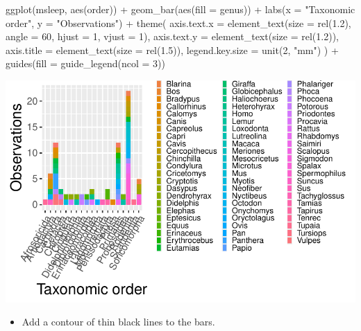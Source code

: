 \documentclass[
  letterpaper,
  DIV=11,
  numbers=noendperiod]{scrartcl}
\newenvironment{Shaded}{\begin{snugshade}}{\end{snugshade}}
\newcommand{\AttributeTok}[1]{\textcolor[rgb]{0.40,0.45,0.13}{#1}}
\newcommand{\DecValTok}[1]{\textcolor[rgb]{0.68,0.00,0.00}{#1}}
\newcommand{\FloatTok}[1]{\textcolor[rgb]{0.68,0.00,0.00}{#1}}
\newcommand{\FunctionTok}[1]{\textcolor[rgb]{0.28,0.35,0.67}{#1}}
\newcommand{\NormalTok}[1]{\textcolor[rgb]{0.00,0.23,0.31}{#1}}
\newcommand{\SpecialCharTok}[1]{\textcolor[rgb]{0.37,0.37,0.37}{#1}}
\newcommand{\StringTok}[1]{\textcolor[rgb]{0.13,0.47,0.30}{#1}}
\providecommand{\tightlist}{%
  \setlength{\itemsep}{0pt}\setlength{\parskip}{0pt}}\usepackage{longtable,booktabs,array}
\begin{document}
\begin{Shaded}
\begin{Highlighting}[]
\FunctionTok{ggplot}\NormalTok{(msleep, }\FunctionTok{aes}\NormalTok{(order)) }\SpecialCharTok{+}
  \FunctionTok{geom\_bar}\NormalTok{(}\FunctionTok{aes}\NormalTok{(}\AttributeTok{fill =}\NormalTok{ genus)) }\SpecialCharTok{+}
  \FunctionTok{labs}\NormalTok{(}\AttributeTok{x =} \StringTok{"Taxonomic order"}\NormalTok{, }\AttributeTok{y =} \StringTok{"Observations"}\NormalTok{) }\SpecialCharTok{+}
  \FunctionTok{theme}\NormalTok{(}
    \AttributeTok{axis.text.x =} \FunctionTok{element\_text}\NormalTok{(}\AttributeTok{size =} \FunctionTok{rel}\NormalTok{(}\FloatTok{1.2}\NormalTok{), }\AttributeTok{angle =} \DecValTok{60}\NormalTok{, }\AttributeTok{hjust =} \DecValTok{1}\NormalTok{, }\AttributeTok{vjust =} \DecValTok{1}\NormalTok{),}
    \AttributeTok{axis.text.y =} \FunctionTok{element\_text}\NormalTok{(}\AttributeTok{size =} \FunctionTok{rel}\NormalTok{(}\FloatTok{1.2}\NormalTok{)),}
    \AttributeTok{axis.title =} \FunctionTok{element\_text}\NormalTok{(}\AttributeTok{size =} \FunctionTok{rel}\NormalTok{(}\FloatTok{1.5}\NormalTok{)),}
    \AttributeTok{legend.key.size =} \FunctionTok{unit}\NormalTok{(}\DecValTok{2}\NormalTok{, }\StringTok{"mm"}\NormalTok{)}
\NormalTok{    ) }\SpecialCharTok{+}
  \FunctionTok{guides}\NormalTok{(}\AttributeTok{fill =} \FunctionTok{guide\_legend}\NormalTok{(}\AttributeTok{ncol =} \DecValTok{3}\NormalTok{))}
\end{Highlighting}
\end{Shaded}

\includegraphics{5-ggplot2_kevin_files/figure-pdf/unnamed-chunk-22-1.pdf}

\begin{itemize}
\tightlist
\item
  Add a contour of thin black lines to the bars.
\end{itemize}
\end{document}
